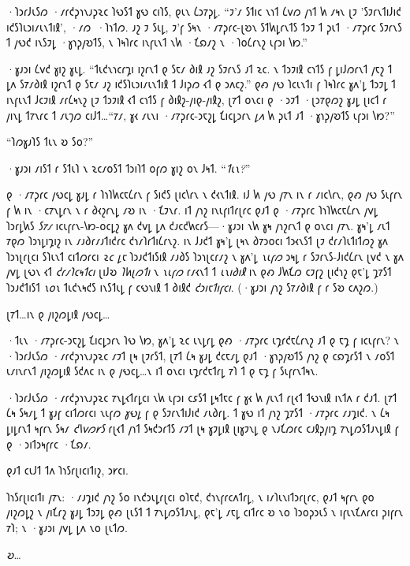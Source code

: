 ·𐑐𐑮𐑩𐑓𐑧𐑕𐑼 ·𐑥𐑩𐑒𐑜𐑪𐑯𐑨𐑜𐑷𐑤 𐑐𐑻𐑕𐑑 𐑣𐑻 𐑤𐑦𐑐𐑕, 𐑞𐑧𐑯 𐑖𐑮𐑳𐑜𐑛. “𐑲'𐑥 𐑕𐑑𐑦𐑤 𐑯𐑪𐑑 𐑖𐑫𐑼 𐑢𐑪𐑑 𐑿 𐑥𐑰𐑯 𐑚𐑲 '𐑕𐑲𐑩𐑯𐑑𐑦𐑓𐑦𐑒 𐑦𐑒𐑕𐑐𐑧𐑮𐑦𐑥𐑧𐑯𐑑𐑦𐑙', ·𐑥𐑼~·𐑐𐑪𐑑𐑼. 𐑨𐑟 𐑲 𐑕𐑧𐑛, 𐑲'𐑝 𐑕𐑰𐑯 ·𐑥𐑳𐑜𐑩𐑤-𐑚𐑹𐑯 𐑕𐑑𐑿𐑛𐑩𐑯𐑑𐑕 𐑑𐑮𐑲 𐑑 𐑜𐑧𐑑 ·𐑥𐑳𐑜𐑩𐑤 𐑕𐑲𐑩𐑯𐑕 𐑑 𐑢𐑻𐑒 𐑦𐑯𐑕𐑲𐑛 ·𐑣𐑪𐑜𐑢𐑹𐑑𐑕, 𐑯 𐑐𐑰𐑐𐑩𐑤 𐑦𐑯𐑝𐑧𐑯𐑑 𐑯𐑿 ·𐑗𐑸𐑥𐑟 𐑯 ·𐑐𐑴𐑖𐑩𐑯𐑟 𐑧𐑝𐑮𐑦 𐑘𐑽.”

·𐑣𐑨𐑮𐑦 𐑖𐑫𐑒 𐑣𐑦𐑟 𐑣𐑧𐑛. “𐑑𐑧𐑒𐑯𐑪𐑤𐑩𐑡𐑦 𐑦𐑟𐑩𐑯𐑑 𐑞 𐑕𐑱𐑥 𐑔𐑦𐑙 𐑨𐑟 𐑕𐑲𐑩𐑯𐑕 𐑨𐑑 𐑷𐑤. 𐑯 𐑑𐑮𐑲𐑦𐑙 𐑤𐑪𐑑𐑕 𐑝 𐑛𐑦𐑓𐑼𐑩𐑯𐑑 𐑢𐑱𐑟 𐑑 𐑛𐑵 𐑕𐑳𐑥𐑔𐑦𐑙 𐑦𐑟𐑩𐑯𐑑 𐑞 𐑕𐑱𐑥 𐑨𐑟 𐑦𐑒𐑕𐑐𐑧𐑮𐑦𐑥𐑧𐑯𐑑𐑦𐑙 𐑑 𐑓𐑦𐑜𐑼 𐑬𐑑 𐑞 𐑮𐑵𐑤𐑟.” 𐑞𐑺 𐑢𐑻 𐑐𐑤𐑧𐑯𐑑𐑦 𐑝 𐑐𐑰𐑐𐑩𐑤 𐑣𐑵'𐑛 𐑑𐑮𐑲𐑛 𐑑 𐑦𐑯𐑝𐑧𐑯𐑑 𐑓𐑤𐑲𐑦𐑙 𐑥𐑩𐑖𐑰𐑯𐑟 𐑚𐑲 𐑑𐑮𐑲𐑦𐑙 𐑬𐑑 𐑤𐑪𐑑𐑕 𐑝 𐑔𐑦𐑙𐑟-𐑢𐑦𐑞-𐑢𐑦𐑙𐑟, 𐑚𐑳𐑑 𐑴𐑯𐑤𐑦 𐑞 ·𐑮𐑲𐑑 ·𐑚𐑮𐑳𐑞𐑼𐑟 𐑣𐑨𐑛 𐑚𐑦𐑤𐑑 𐑩 𐑢𐑦𐑯𐑛 𐑑𐑳𐑯𐑩𐑤 𐑑 𐑥𐑧𐑠𐑼 𐑤𐑦𐑓𐑑…“𐑳𐑥, 𐑣𐑬 𐑥𐑧𐑯𐑦 ·𐑥𐑳𐑜𐑩𐑤-𐑮𐑱𐑟𐑛 𐑗𐑦𐑤𐑛𐑮𐑩𐑯 \emph{𐑛𐑵} 𐑿 𐑜𐑧𐑑 𐑨𐑑 ·𐑣𐑪𐑜𐑢𐑹𐑑𐑕 𐑧𐑝𐑮𐑦 𐑘𐑽?”

“𐑐𐑼𐑣𐑨𐑐𐑕 𐑑𐑧𐑯 𐑹 𐑕𐑴?”

·𐑣𐑨𐑮𐑦 𐑥𐑦𐑕𐑑 𐑩 𐑕𐑑𐑧𐑐 𐑯 𐑷𐑤𐑥𐑴𐑕𐑑 𐑑𐑮𐑦𐑐𐑑 𐑴𐑝𐑼 𐑣𐑦𐑟 𐑴𐑯 𐑓𐑰𐑑. “\emph{𐑑𐑧𐑯?}”

𐑞 ·𐑥𐑳𐑜𐑩𐑤 𐑢𐑻𐑤𐑛 𐑣𐑨𐑛 𐑩 𐑐𐑪𐑐𐑿𐑤𐑱𐑖𐑩𐑯 𐑝 𐑕𐑦𐑒𐑕 𐑚𐑦𐑤𐑘𐑩𐑯 𐑯 𐑒𐑬𐑯𐑑𐑦𐑙. 𐑦𐑓 𐑿 𐑢𐑻 𐑢𐑳𐑯 𐑦𐑯 𐑩 𐑥𐑦𐑤𐑘𐑩𐑯, 𐑞𐑺 𐑢𐑻 𐑕𐑧𐑝𐑩𐑯 𐑝 𐑿 𐑦𐑯 ·𐑤𐑳𐑯𐑛𐑩𐑯 𐑯 𐑩 𐑔𐑬𐑟𐑩𐑯𐑛 𐑥𐑹 𐑦𐑯 ·𐑗𐑲𐑯𐑩. 𐑦𐑑 𐑢𐑪𐑟 𐑦𐑯𐑧𐑝𐑦𐑑𐑩𐑚𐑩𐑤 𐑞𐑨𐑑 𐑞 ·𐑥𐑳𐑜𐑩𐑤 𐑐𐑪𐑐𐑿𐑤𐑱𐑖𐑩𐑯 𐑢𐑫𐑛 𐑐𐑮𐑩𐑛𐑿𐑕 \emph{𐑕𐑳𐑥} 𐑦𐑤𐑧𐑝𐑩𐑯-𐑘𐑽-𐑴𐑤𐑛𐑟 𐑣𐑵 𐑒𐑫𐑛 𐑛𐑵 𐑒𐑨𐑤𐑒𐑿𐑤𐑩𐑕—·𐑣𐑨𐑮𐑦 𐑯𐑿 𐑣𐑰 𐑢𐑪𐑟𐑩𐑯𐑑 𐑞 𐑴𐑯𐑤𐑦 𐑢𐑳𐑯. 𐑣𐑰'𐑛 𐑥𐑧𐑑 𐑳𐑞𐑼 𐑐𐑮𐑪𐑛𐑦𐑡𐑦𐑟 𐑦𐑯 𐑥𐑨𐑔𐑩𐑥𐑨𐑑𐑦𐑒𐑩𐑤 𐑒𐑪𐑥𐑐𐑩𐑑𐑦𐑖𐑩𐑯𐑟. 𐑦𐑯 𐑓𐑨𐑒𐑑 𐑣𐑰'𐑛 𐑚𐑰𐑯 𐑔𐑳𐑮𐑴𐑤𐑦 𐑑𐑮𐑬𐑯𐑕𐑑 𐑚𐑲 𐑒𐑩𐑥𐑐𐑧𐑑𐑦𐑑𐑼𐑟 𐑣𐑵 𐑐𐑮𐑪𐑚𐑩𐑚𐑤𐑦 𐑕𐑐𐑧𐑯𐑑 𐑤𐑦𐑑𐑼𐑩𐑤𐑦 \emph{𐑷𐑤 𐑛𐑱} 𐑐𐑮𐑨𐑒𐑑𐑦𐑕𐑦𐑙 𐑥𐑨𐑔𐑕 𐑐𐑮𐑪𐑚𐑤𐑩𐑥𐑟 𐑯 𐑣𐑵'𐑛 \emph{𐑯𐑧𐑝𐑼} 𐑮𐑰𐑛 𐑩 𐑕𐑲𐑩𐑯𐑕-𐑓𐑦𐑒𐑖𐑩𐑯 𐑚𐑫𐑒 𐑯 𐑣𐑵 𐑢𐑫𐑛 𐑚𐑻𐑯 𐑬𐑑 \emph{𐑒𐑩𐑥𐑐𐑤𐑰𐑑𐑤𐑦} 𐑚𐑦𐑓𐑹 \emph{𐑐𐑿𐑚𐑼𐑑𐑦} 𐑯 \emph{𐑯𐑧𐑝𐑼} 𐑩𐑥𐑬𐑯𐑑 𐑑 \emph{𐑧𐑯𐑦𐑔𐑦𐑙} 𐑦𐑯 𐑞𐑺 𐑓𐑿𐑗𐑼 𐑤𐑲𐑝𐑟 𐑚𐑦𐑒𐑪𐑟 𐑞𐑱'𐑛 𐑡𐑳𐑕𐑑 𐑐𐑮𐑨𐑒𐑑𐑦𐑕𐑑 \emph{𐑯𐑴𐑯} 𐑑𐑧𐑒𐑯𐑰𐑒𐑕 𐑦𐑯𐑕𐑑𐑧𐑛 𐑝 𐑤𐑻𐑯𐑦𐑙 𐑑 𐑔𐑦𐑙𐑒 \emph{𐑒𐑮𐑦𐑱𐑑𐑦𐑝𐑤𐑦}. (·𐑣𐑨𐑮𐑦 𐑢𐑪𐑟 𐑕𐑳𐑥𐑔𐑦𐑙 𐑝 𐑩 𐑕𐑹 𐑤𐑵𐑟𐑼.)

𐑚𐑳𐑑…𐑦𐑯 𐑞 𐑢𐑦𐑟𐑼𐑛𐑦𐑙 𐑢𐑻𐑤𐑛…

·𐑑𐑧𐑯 ·𐑥𐑳𐑜𐑩𐑤-𐑮𐑱𐑟𐑛 𐑗𐑦𐑤𐑛𐑮𐑩𐑯 𐑐𐑻 𐑘𐑽, 𐑣𐑵'𐑛 𐑷𐑤 𐑧𐑯𐑛𐑩𐑛 𐑞𐑺 ·𐑥𐑳𐑜𐑩𐑤 𐑧𐑡𐑩𐑒𐑱𐑖𐑩𐑯𐑟 𐑨𐑑 𐑞 𐑱𐑡 𐑝 𐑦𐑤𐑧𐑝𐑩𐑯? 𐑯 ·𐑐𐑮𐑩𐑓𐑧𐑕𐑼 ·𐑥𐑩𐑒𐑜𐑪𐑯𐑨𐑜𐑷𐑤 𐑥𐑲𐑑 𐑚𐑰 𐑚𐑲𐑩𐑕𐑑, 𐑚𐑳𐑑 𐑖𐑰 𐑣𐑨𐑛 𐑒𐑤𐑱𐑥𐑛 𐑞𐑨𐑑 ·𐑣𐑪𐑜𐑢𐑹𐑑𐑕 𐑢𐑪𐑟 𐑞 𐑤𐑸𐑡𐑩𐑕𐑑 𐑯 𐑥𐑴𐑕𐑑 𐑧𐑥𐑦𐑯𐑩𐑯𐑑 𐑢𐑦𐑟𐑼𐑛𐑦𐑙 𐑕𐑒𐑵𐑤 𐑦𐑯 𐑞 𐑢𐑻𐑤𐑛…𐑯 𐑦𐑑 𐑴𐑯𐑤𐑦 𐑧𐑡𐑩𐑒𐑱𐑑𐑩𐑛 𐑳𐑐 𐑑 𐑞 𐑱𐑡 𐑝 𐑕𐑧𐑝𐑩𐑯𐑑𐑰𐑯.

·𐑐𐑮𐑩𐑓𐑧𐑕𐑼 ·𐑥𐑩𐑒𐑜𐑪𐑯𐑨𐑜𐑷𐑤 𐑳𐑯𐑛𐑬𐑑𐑩𐑛𐑤𐑦 𐑯𐑿 𐑧𐑝𐑮𐑦 𐑤𐑭𐑕𐑑 𐑛𐑰𐑑𐑱𐑤 𐑝 𐑣𐑬 𐑿 𐑢𐑧𐑯𐑑 𐑩𐑚𐑬𐑑 𐑑𐑻𐑯𐑦𐑙 𐑦𐑯𐑑𐑵 𐑩 𐑒𐑨𐑑. 𐑚𐑳𐑑 𐑖𐑰 𐑕𐑰𐑥𐑛 𐑑 𐑣𐑨𐑝 𐑤𐑦𐑑𐑼𐑩𐑤𐑦 𐑯𐑧𐑝𐑼 \emph{𐑣𐑻𐑛} 𐑝 𐑞 𐑕𐑲𐑩𐑯𐑑𐑦𐑓𐑦𐑒 𐑥𐑧𐑔𐑩𐑛. 𐑑 𐑣𐑻 𐑦𐑑 𐑢𐑪𐑟 𐑡𐑳𐑕𐑑 ·𐑥𐑳𐑜𐑩𐑤 𐑥𐑨𐑡𐑦𐑒. 𐑯 𐑖𐑰 𐑛𐑦𐑛𐑩𐑯𐑑 𐑰𐑝𐑩𐑯 𐑕𐑰𐑥 \emph{𐑒𐑘𐑫𐑼𐑾𐑕} 𐑩𐑚𐑬𐑑 𐑢𐑪𐑑 𐑕𐑰𐑒𐑮𐑩𐑑𐑕 𐑥𐑲𐑑 𐑚𐑰 𐑣𐑲𐑛𐑦𐑙 𐑚𐑦𐑣𐑲𐑯𐑛 𐑞 𐑯𐑨𐑗𐑼𐑩𐑤 𐑤𐑨𐑙𐑜𐑢𐑦𐑡 𐑳𐑯𐑛𐑼𐑕𐑑𐑨𐑯𐑛𐑦𐑙 𐑝 𐑞 ·𐑮𐑦𐑑𐑮𐑰𐑝𐑩𐑤 ·𐑗𐑸𐑥.

𐑞𐑨𐑑 𐑤𐑧𐑓𐑑 𐑑𐑵 𐑐𐑪𐑕𐑩𐑚𐑦𐑤𐑦𐑑𐑦𐑟, 𐑮𐑾𐑤𐑦.

𐑐𐑪𐑕𐑩𐑚𐑦𐑤𐑦𐑑𐑦 𐑢𐑳𐑯: ·𐑥𐑨𐑡𐑦𐑒 𐑢𐑪𐑟 𐑕𐑴 𐑦𐑯𐑒𐑮𐑧𐑛𐑩𐑚𐑤𐑦 𐑴𐑐𐑱𐑒, 𐑒𐑪𐑯𐑝𐑩𐑤𐑵𐑑𐑩𐑛, 𐑯 𐑦𐑥𐑐𐑧𐑯𐑦𐑑𐑮𐑩𐑚𐑩𐑤, 𐑞𐑨𐑑 𐑰𐑝𐑩𐑯 𐑞𐑴 𐑢𐑦𐑟𐑼𐑛𐑟 𐑯 𐑢𐑦𐑗𐑩𐑟 𐑣𐑨𐑛 𐑑𐑮𐑲𐑛 𐑞𐑺 𐑚𐑧𐑕𐑑 𐑑 𐑳𐑯𐑛𐑼𐑕𐑑𐑨𐑯𐑛, 𐑞𐑱'𐑛 𐑥𐑱𐑛 𐑤𐑦𐑑𐑩𐑤 𐑹 𐑯𐑴 𐑐𐑮𐑴𐑜𐑮𐑧𐑕 𐑯 𐑦𐑝𐑧𐑯𐑗𐑵𐑩𐑤𐑦 𐑜𐑦𐑝𐑩𐑯 𐑳𐑐; 𐑯 ·𐑣𐑨𐑮𐑦 𐑢𐑫𐑛 𐑛𐑵 𐑯𐑴 𐑚𐑧𐑑𐑼.

\emph{𐑹}…


